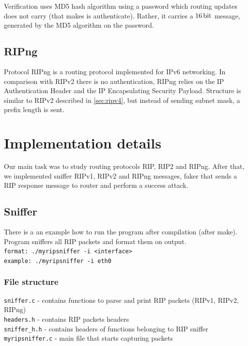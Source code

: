\documentclass[11pt,a4paper]{article}
\begin{document}
\noindent
Verification uses MD5 hash algorithm using a password which routing updates does not carry (that makes is authenticate). Rather, it carries a $\SI{16}{\bit}$ message, generated by the MD5 algorithm on the password.


\subsection{RIPng}
Protocol RIPng is a routing protocol implemented for IPv6 networking. In comparison with RIPv2 there is no authentication, RIPng relies on the IP Authentication Header\cite{ip_header} and the IP Encapsulating Security Payload\cite{payload}\cite{ripng}. Structure is similar to RIPv2 described in \ref{sec:ripv4}, but instead of sending subnet mask, a prefix length is sent. 


\section{Implementation details}
Our main task was to study routing protocols RIP, RIP2 and RIPng. After that, we implemented sniffer RIPv1, RIPv2 and RIPng messages, faker that sends a RIP response message to router and perform a success attack.

\subsection{Sniffer}
There is a an example how to run the program after compilation (after make). Program sniffers all RIP packets and format them on output.\\

\noindent
\texttt{format: ./myripsniffer -i <interface>}\\
\texttt{example: ./myripsniffer -i eth0}

\subsubsection{File structure}
\texttt{sniffer.c} - contains functions to parse and print RIP packets (RIPv1, RIPv2, RIPng)\\
\texttt{headers.h} - contains RIP packets headers\\
\texttt{sniffer\_h.h} - contains headers of functions belonging to RIP sniffer\\
\texttt{myripsniffer.c} - main file that starts capturing packets\\
\end{document}
